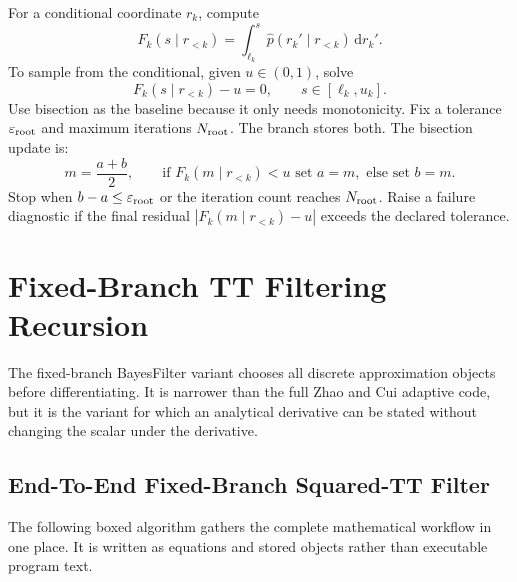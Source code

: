 \documentclass[11pt]{article}
\newcommand{\dd}{\,\mathrm d}
\begin{document}
For a conditional coordinate \(r_k\), compute
\[
    F_k(s\mid r_{<k})
    =
    \int_{\ell_k}^{s}\widehat p(r_k'\mid r_{<k})\dd r_k'.
\]
To sample from the conditional, given \(u\in(0,1)\), solve
\[
    F_k(s\mid r_{<k})-u=0,\qquad s\in[\ell_k,u_k].
\]
Use bisection as the baseline because it only needs monotonicity.  Fix a
tolerance \(\varepsilon_{\rm root}\) and maximum iterations \(N_{\rm root}\).
The branch stores both.  The bisection update is:
\[
    m=\frac{a+b}{2},\qquad
    \text{if }F_k(m\mid r_{<k})<u\text{ set }a=m,\text{ else set }b=m.
\]
Stop when \(b-a\le\varepsilon_{\rm root}\) or the iteration count reaches
\(N_{\rm root}\).  Raise a failure diagnostic if the final residual
\(|F_k(m\mid r_{<k})-u|\) exceeds the declared tolerance.

\section{Fixed-Branch TT Filtering Recursion}

The fixed-branch BayesFilter variant chooses all discrete approximation objects
before differentiating.  It is narrower than the full Zhao and Cui \cite{zhao2024ttsequential} adaptive code,
but it is the variant for which an analytical derivative can be stated without
changing the scalar under the derivative.

\subsection{End-To-End Fixed-Branch Squared-TT Filter}

The following boxed algorithm gathers the complete mathematical workflow in one
place.  It is written as equations and stored objects rather than executable
program text.
\end{document}

